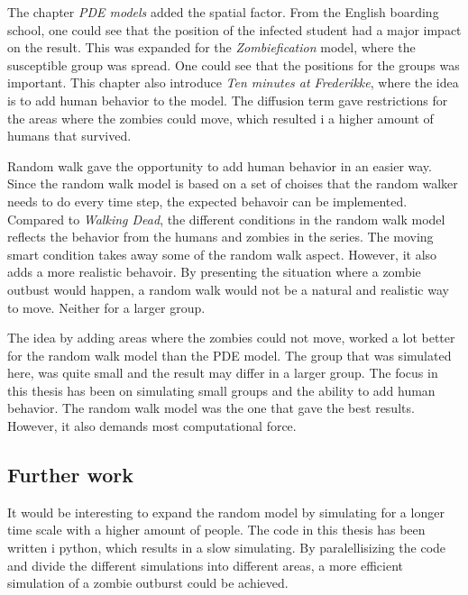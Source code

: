 \documentclass[%
twoside,                 %
final,                   %
chapterprefix=true,      %
open=right               %
10pt]{book}
\begin{document}
\vspace{3mm}




\vspace{3mm}


The chapter \emph{PDE models} added the spatial factor. From the English boarding school, one could see that the position of the infected student had a major impact on the result. This was expanded for the \emph{Zombiefication} model, where the susceptible group was spread. One could see that the positions for the groups was important. This chapter also introduce \emph{Ten minutes at Frederikke}, where the idea is to add human behavior to the model. The diffusion term gave restrictions for the areas where the zombies could move, which resulted i a higher amount of humans that survived. 


\vspace{3mm}




\vspace{3mm}


Random walk gave the opportunity to add human behavior in an easier way. Since the random walk model is based on a set of choises that the random walker needs to do every time step, the expected behavoir can be implemented. Compared to \emph{Walking Dead}, the different conditions in the random walk model reflects the behavior from the humans and zombies in the series. The moving smart condition takes away some of the random walk aspect. However, it also adds a more realistic behavoir. By presenting the situation where a zombie outbust would happen, a random walk would not be a natural and realistic way to move. Neither for a larger group. 


\vspace{3mm}




\vspace{3mm}


The idea by adding areas where the zombies could not move, worked a lot better for the random walk model than the PDE model. The group that was simulated here, was quite small and the result may differ in a larger group. The focus in this thesis has been on simulating small groups and the ability to add human behavior. The random walk model was the one that gave the best results. However, it also demands most computational force.

\subsection{Further work}
It would be interesting to expand the random model by simulating for a longer time scale with a higher amount of people. The code in this thesis has been written i python, which results in a slow simulating. By paralellisizing the code and divide the different simulations into different areas, a more efficient simulation of a zombie outburst could be achieved.
\end{document}
